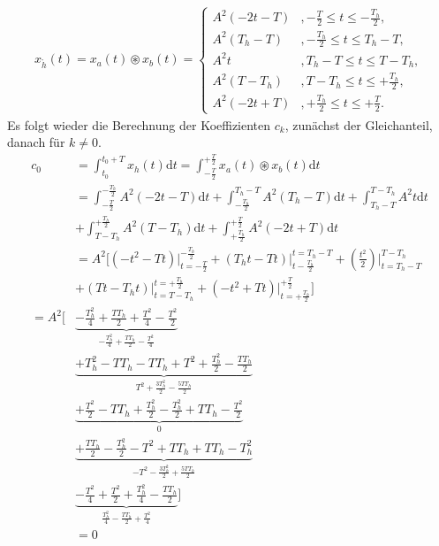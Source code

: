 \documentclass[11pt,a4paper,DIV=12]{scrartcl}
\newcommand{\diff}{\mathrm{d}}
\begin{document}
%
%
\begin{align}
	x_{\mathring{h}}(t)=x_{a}(t)\circledast x_{b}(t)
	=
	\begin{cases}
		A^2(-2t-T)&,-\frac{T}{2}\leq t \leq -\frac{T_h}{2}, \\
		A^2(T_h-T)&,-\frac{T_h}{2}\leq t \leq T_h-T, \\
		A^2t &,T_h-T\leq t \leq T-T_h, \\
		A^2(T-T_h)&,T-T_h\leq t \leq +\frac{T_h}{2}, \\
		A^2(-2t+T)&,+\frac{T_h}{2}\leq t \leq +\frac{T}{2}.
	\end{cases}
\end{align}
%
%
Es folgt wieder die Berechnung der Koeffizienten $c_k$, zunächst der
Gleichanteil, danach für $k\neq 0$.
%
%
\begin{align}
	c_0&=\int_{t_0}^{t_0+T}x_{h}(t)\diff t
	=\int_{-\frac{T}{2}}^{+\frac{T}{2}}x_{a}(t)\circledast x_{b}(t)\diff t\nonumber \\
	&=\int_{-\frac{T}{2}}^{-\frac{T_h}{2}}A^2(-2t-T)\diff t+\int_{-\frac{T_h}{2}}^{T_h-T}A^2(T_h-T)\diff t+\int_{T_h-T}^{T-T_h}A^2t\diff t\nonumber \\
	&+\int_{T-T_h}^{+\frac{T_h}{2}}A^2(T-T_h)\diff t+\int_{+\frac{T_h}{2}}^{+\frac{T}{2}}A^2(-2t+T)\diff t\nonumber \\
	&=A^2\Bigg[\left(-t^2-Tt\right)\Bigg |_{t=-\frac{T}{2}}^{-\frac{T_h}{2}}+\left(T_ht-Tt\right)\Bigg |_{t-\frac{T_h}{2}}^{t=T_h-T}+\left(\frac{t^2}{2}\right)\Bigg |_{t=T_h-T}^{T-T_h}\nonumber \\
	&+\left(Tt-T_ht\right)\Bigg |_{t=T-T_h}^{t=+\frac{T_h}{2}}+\left(-t^2+Tt\right)\Bigg |_{t=+\frac{T_h}{2}}^{+\frac{T}{2}}\Bigg]\nonumber \\
	=A^2\Bigg [&\underbrace{-\frac{T_h^2}{4}+\frac{TT_h}{2}+\frac{T^2}{4}-\frac{T^2}{2}}_{-\frac{T_h^2}{4}+\frac{TT_h}{2}-\frac{T^2}{4}}\nonumber \\
	&\underbrace{+T_h^2-TT_h-TT_h+T^2+\frac{T_h^2}{2} -\frac{TT_h}{2}}_{T^2+\frac{3T_h^2}{2}-\frac{5TT_h}{2}}\nonumber \\
	&\underbrace{+\frac{T^2}{2}-TT_h+\frac{T_h^2}{2}-\frac{T_h^2}{2}+TT_h-\frac{T^2}{2}}_{0}\nonumber \\
	&\underbrace{+\frac{TT_h}{2}-\frac{T_h^2}{2}-T^2+TT_h+TT_h-T_h^2}_{-T^2-\frac{3T_h^2}{2}+\frac{5TT_h}{2}}\nonumber \\
	&\underbrace{-\frac{T^2}{4}+\frac{T^2}{2}+\frac{T_h^2}{4}-\frac{TT_h}{2}}_{\frac{T_h^2}{4}-\frac{TT_h}{2}+\frac{T^2}{4}}\Bigg ]\nonumber \\
	&= 0
\end{align}
\end{document}
